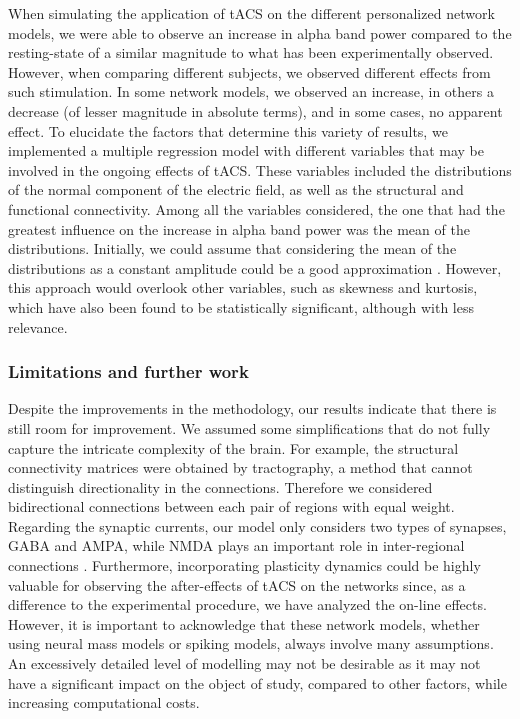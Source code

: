 \documentclass[../main.tex]{subfiles}
\begin{document}
When simulating the application of tACS on the different personalized network models, we were able to observe an increase in alpha band power compared to the resting-state of a similar magnitude to what has been experimentally observed.
However, when comparing different subjects, we observed different effects from such stimulation.
In some network models, we observed an increase, in others a decrease (of lesser magnitude in absolute terms), and in some cases, no apparent effect.
To elucidate the factors that determine this variety of results, we implemented a multiple regression model with different variables that may be involved in the ongoing effects of tACS.
These variables included the distributions of the normal component of the electric field, as well as the structural and functional connectivity.
Among all the variables considered, the one that had the greatest influence on the increase in alpha band power was the mean of the distributions.
Initially, we could assume that considering the mean of the distributions as a constant amplitude could be a good approximation \citep{merlet_oscillatory_2013}.
However, this approach would overlook other variables, such as skewness and kurtosis, which have also been found to be statistically significant, although with less relevance.

\subsubsection{Limitations and further work}
Despite the improvements in the methodology, our results indicate that there is still room for improvement.
We assumed some simplifications that do not fully capture the intricate complexity of the brain.
For example, the structural connectivity matrices were obtained by tractography, a method that cannot distinguish directionality in the connections.
Therefore we considered bidirectional connections between each pair of regions with equal weight.
Regarding the synaptic currents, our model only considers two types of synapses, GABA and AMPA, while NMDA plays an important role in inter-regional connections \citep{kuhlmann2013modulation,reese2015spontaneous,hoflich2015ketamine}.
Furthermore, incorporating plasticity dynamics could be highly valuable for observing the after-effects of tACS on the networks \citep{vossen_alpha_2015,schwab2021spike, jeong2021modulation} since, as a difference to the experimental procedure, we have analyzed the on-line effects.
However, it is important to acknowledge that these network models, whether using neural mass models or spiking models, always involve many assumptions.
An excessively detailed level of modelling may not be desirable as it may not have a significant impact on the object of study, compared to other factors, while increasing computational costs.
\end{document}
